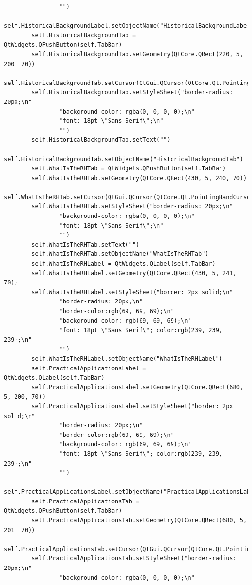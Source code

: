 \documentclass{article}
\begin{document}
\begin{lstlisting}
                "")
        self.HistoricalBackgroundLabel.setObjectName("HistoricalBackgroundLabel")
        self.HistoricalBackgroundTab = QtWidgets.QPushButton(self.TabBar)
        self.HistoricalBackgroundTab.setGeometry(QtCore.QRect(220, 5, 200, 70))
        self.HistoricalBackgroundTab.setCursor(QtGui.QCursor(QtCore.Qt.PointingHandCursor))
        self.HistoricalBackgroundTab.setStyleSheet("border-radius: 20px;\n"
                "background-color: rgba(0, 0, 0, 0);\n"
                "font: 18pt \"Sans Serif\";\n"
                "")
        self.HistoricalBackgroundTab.setText("")
        self.HistoricalBackgroundTab.setObjectName("HistoricalBackgroundTab")
        self.WhatIsTheRHTab = QtWidgets.QPushButton(self.TabBar)
        self.WhatIsTheRHTab.setGeometry(QtCore.QRect(430, 5, 240, 70))
        self.WhatIsTheRHTab.setCursor(QtGui.QCursor(QtCore.Qt.PointingHandCursor))
        self.WhatIsTheRHTab.setStyleSheet("border-radius: 20px;\n"
                "background-color: rgba(0, 0, 0, 0);\n"
                "font: 18pt \"Sans Serif\";\n"
                "")
        self.WhatIsTheRHTab.setText("")
        self.WhatIsTheRHTab.setObjectName("WhatIsTheRHTab")
        self.WhatIsTheRHLabel = QtWidgets.QLabel(self.TabBar)
        self.WhatIsTheRHLabel.setGeometry(QtCore.QRect(430, 5, 241, 70))
        self.WhatIsTheRHLabel.setStyleSheet("border: 2px solid;\n"
                "border-radius: 20px;\n"
                "border-color:rgb(69, 69, 69);\n"
                "background-color: rgb(69, 69, 69);\n"
                "font: 18pt \"Sans Serif\"; color:rgb(239, 239, 239);\n"
                "")
        self.WhatIsTheRHLabel.setObjectName("WhatIsTheRHLabel")
        self.PracticalApplicationsLabel = QtWidgets.QLabel(self.TabBar)
        self.PracticalApplicationsLabel.setGeometry(QtCore.QRect(680, 5, 200, 70))
        self.PracticalApplicationsLabel.setStyleSheet("border: 2px solid;\n"
                "border-radius: 20px;\n"
                "border-color:rgb(69, 69, 69);\n"
                "background-color: rgb(69, 69, 69);\n"
                "font: 18pt \"Sans Serif\"; color:rgb(239, 239, 239);\n"
                "")
        self.PracticalApplicationsLabel.setObjectName("PracticalApplicationsLabel")
        self.PracticalApplicationsTab = QtWidgets.QPushButton(self.TabBar)
        self.PracticalApplicationsTab.setGeometry(QtCore.QRect(680, 5, 201, 70))
        self.PracticalApplicationsTab.setCursor(QtGui.QCursor(QtCore.Qt.PointingHandCursor))
        self.PracticalApplicationsTab.setStyleSheet("border-radius: 20px;\n"
                "background-color: rgba(0, 0, 0, 0);\n"

\end{lstlisting}
\end{document}
